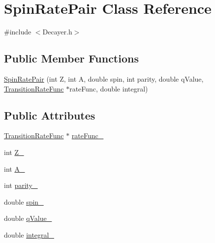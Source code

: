 \hypertarget{classSpinRatePair}{\section{Spin\-Rate\-Pair Class Reference}
\label{classSpinRatePair}
}


{\ttfamily \#include $<$Decayer.\-h$>$}

\subsection*{Public Member Functions}
\begin{DoxyCompactItemize}
\item 
\hyperlink{classSpinRatePair_a041ba492d89c65a3a08c8ab7043bd56e}{Spin\-Rate\-Pair} (int Z, int A, double spin, int parity, double q\-Value, \hyperlink{classTransitionRateFunc}{Transition\-Rate\-Func} $\ast$rate\-Func, double integral)
\end{DoxyCompactItemize}
\subsection*{Public Attributes}
\begin{DoxyCompactItemize}
\item 
\hyperlink{classTransitionRateFunc}{Transition\-Rate\-Func} $\ast$ \hyperlink{classSpinRatePair_a707563d58850763b4c67256ed3b36b6e}{rate\-Func\-\_\-}
\item 
int \hyperlink{classSpinRatePair_abcfea082d53a68d433b3deac710f1731}{Z\-\_\-}
\item 
int \hyperlink{classSpinRatePair_a84871c2c6b1c5e5e494bb613e78333e3}{A\-\_\-}
\item 
int \hyperlink{classSpinRatePair_af399ce33ae6123fa1ec7173932640533}{parity\-\_\-}
\item 
double \hyperlink{classSpinRatePair_ab52ca1bd083db60ceaf8fe58b4647669}{spin\-\_\-}
\item 
double \hyperlink{classSpinRatePair_af4ac45dc668f2bb9a01039f4a454d980}{q\-Value\-\_\-}
\item 
double \hyperlink{classSpinRatePair_a824af3ac72d5a9e35f12198dbe8ad182}{integral\-\_\-}
\end{DoxyCompactItemize}



